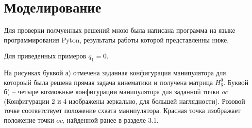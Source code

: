 \documentclass[a4paper,14pt]{extreport}
\begin{document}
	\section{Моделирование}
	
	Для проверки полчуенных решений мною была написана программа на языке программирования Pyton, результаты работы которой представленны ниже.
	
	Для приведенных примеров $q_1 = 0$. 
	
	На рисунках буквой а) отмечена заданная конфигурация манипулятора для котороый была решена прямая задача кинематики и получена матрица $H^0_6$. Буквой б) -- четыре возможные конфигурации манипулятора для заданной точки $oc$ (Конфигурации 2 и 4 изображены зеркально, для большей наглядности).
	Розовой точке соответствует положение схвата манипулятора. Красная точка изображает положение точки $oc$, найденной ранее в разделе 3.1.  
	
\end{document}
